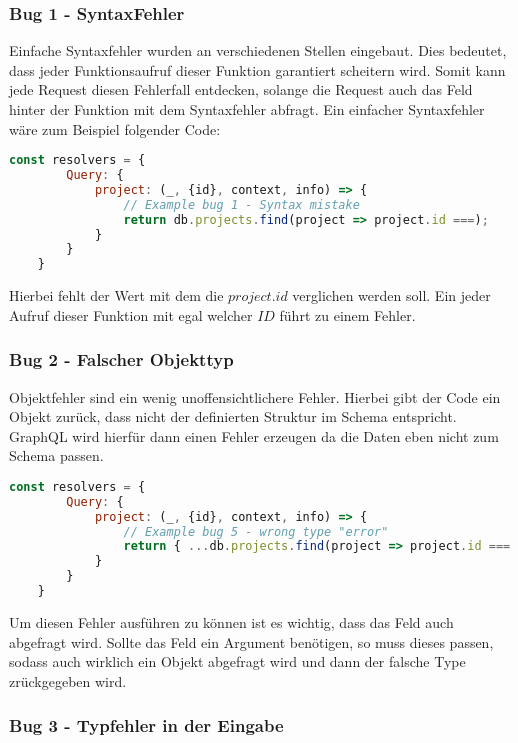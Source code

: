 \subsubsection{Bug 1 - SyntaxFehler}

Einfache Syntaxfehler wurden an verschiedenen Stellen eingebaut.
Dies bedeutet, dass jeder Funktionsaufruf dieser Funktion garantiert scheitern wird.
Somit kann jede Request diesen Fehlerfall entdecken, solange die Request auch das Feld hinter der Funktion mit dem Syntaxfehler abfragt.
Ein einfacher Syntaxfehler wäre zum Beispiel folgender Code: \\

\begin{lstlisting}[language=javascript]
    const resolvers = {
        Query: {
            project: (_, {id}, context, info) => {
                // Example bug 1 - Syntax mistake
                return db.projects.find(project => project.id ===);
            }
        }
    }
\end{lstlisting}

Hierbei fehlt der Wert mit dem die $project.id$ verglichen werden soll.
Ein jeder Aufruf dieser Funktion mit egal welcher $ID$ führt zu einem Fehler.

\subsubsection{Bug 2 - Falscher Objekttyp}

Objektfehler sind ein wenig unoffensichtlichere Fehler.
Hierbei gibt der Code ein Objekt zurück, dass nicht der definierten Struktur im Schema entspricht.
GraphQL wird hierfür dann einen Fehler erzeugen da die Daten eben nicht zum Schema passen.

\begin{lstlisting}[language=javascript]
    const resolvers = {
        Query: {
            project: (_, {id}, context, info) => {
                // Example bug 5 - wrong type "error"
                return { ...db.projects.find(project => project.id === id), name: ["a", "b"] };
            }
        }
    }
\end{lstlisting}

Um diesen Fehler ausführen zu können ist es wichtig, dass das Feld auch abgefragt wird.
Sollte das Feld ein Argument benötigen, so muss dieses passen, sodass auch wirklich ein Objekt abgefragt wird und dann der falsche Type zrückgegeben wird.

\subsubsection{Bug 3 - Typfehler in der Eingabe}

